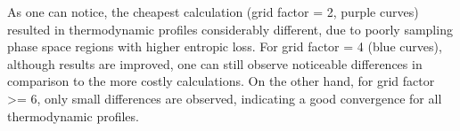 \documentclass[10pt,a4paper]{report}
\begin{document}
  As one can notice, the cheapest calculation (grid factor = 2, purple curves) resulted in thermodynamic 
profiles considerably different, due to poorly sampling phase space regions with higher
entropic loss. For grid factor = 4 (blue curves), although results are improved,
one can still observe noticeable differences in comparison to the more costly
calculations. On the other hand, for grid factor >= 6, only small differences
are observed, indicating a good convergence for all thermodynamic profiles.


\end{document}
